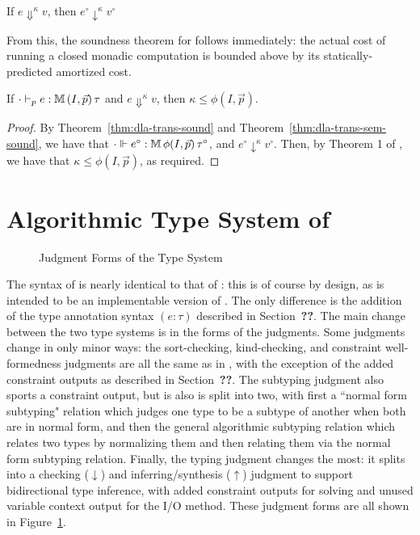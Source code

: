 \begin{theorem}
\label{thm:dla-trans-sem-sound}
If $e \Downarrow^\kappa v$, then $e^\circ \downarrow^\kappa v^\circ$
\end{theorem}

From this, the soundness theorem for \dlambdaamor follows immediately: the actual cost of running a closed monadic computation is bounded above by its statically-predicted amortized cost.

\begin{theorem}
\label{thm:dlambdaamor-sound}
If $\cdot \vdash_p e : \mathbb{M} \, (I,\vec{p}) \, \tau$ and $e \Downarrow^\kappa v$, then $\kappa \leq \phi(I,\vec{p})$.
\end{theorem}
\begin{proof}
By Theorem~\ref{thm:dla-trans-sound} and Theorem~\ref{thm:dla-trans-sem-sound}, we have that $\cdot \Vdash e^\circ  : \mathbb{M} \, \phi(I,\vec{p}) \, \tau^\circ$, and $e^\circ \downarrow^\kappa v^\circ$. Then, by Theorem 1 of \citet{rajani-et-al:popl21}, we have that $\kappa \leq \phi(I,\vec{p})$, as required.
\end{proof}



\section{Algorithmic Type System of \bilambdaamor}
\label{sec:bilambdaamor-syntax-and-types}
\begin{figure}
\label{fig:bilambdaamor-typing-judgments}
\caption{Judgment Forms of the \bilambdaamor Type System}
\end{figure}



The syntax of \bilambdaamor is nearly identical to that of \dlambdaamor: this is of course by design, as \bilambdaamor is intended to be an implementable version of \dlambdaamor. The only difference is the addition of the type annotation syntax $(e : \tau)$ described in Section~\textbf{??}. The main change between the two type systems is in the forms of the judgments. Some judgments change in only minor ways: the sort-checking, kind-checking, and constraint well-formedness judgments are all the same as in \dlambdaamor, with the exception of the added constraint outputs as described in Section~\textbf{??}. The subtyping judgment also sports a constraint output, but is also is split into two, with first a ``normal form subtyping" relation which judges one type to be a subtype of another when both are in normal form, and then the general algorithmic subtyping relation which relates two types by normalizing them and then relating them via the normal form subtyping relation. Finally, the typing judgment changes the most: it splits into a checking ($\downarrow$) and inferring/synthesis ($\uparrow$) judgment to support bidirectional type inference, with added constraint outputs for solving and unused variable context output for the I/O method. These judgment forms are all shown in Figure~\ref{fig:bilambdaamor-typing-judgments}.


